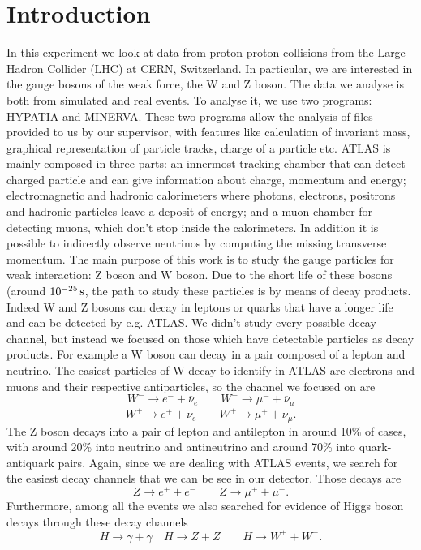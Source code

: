 \documentclass[a4paper,10pt]{article}
\begin{document}
\section{Introduction}
In this experiment we look at data from proton-proton-collisions from the Large Hadron Collider (LHC) at CERN, Switzerland. In particular, we are interested in the gauge bosons of the weak force, the W and Z boson. The data we analyse is both from simulated and real events. To analyse it, we use two programs: HYPATIA and MINERVA. These two programs allow the analysis of files provided to us by our supervisor, with features like calculation of invariant mass, graphical representation of particle tracks, charge of a particle etc.
ATLAS is mainly composed in three parts: an innermost tracking chamber that can detect charged particle and can give information about charge, momentum and energy; electromagnetic and hadronic calorimeters where photons, electrons, positrons and hadronic particles leave a deposit of energy; and a muon chamber for detecting muons, which don't stop inside the calorimeters. In addition it is possible to indirectly observe neutrinos by computing the missing transverse momentum. 
The main purpose of this work is to study the gauge particles for weak interaction: Z boson and W boson. Due to the short life of these bosons (around $\SI{E-25}{\second}$, the path to study these particles is by means of decay products. Indeed W and Z bosons can decay in leptons or quarks that have a longer life and can be detected by e.g. ATLAS. We didn't study every possible decay channel, but instead we focused on those which have detectable particles as decay products. For example a W boson can decay in a pair composed of a lepton and neutrino. The easiest particles of W decay to identify in ATLAS are electrons and muons and their respective antiparticles, so the channel we focused on are
\[W^- \to e^- + \overline{\nu}_e \qquad W^- \to \mu^- + \overline{\nu}_\mu\]
\[W^+ \to e^+ + \nu_e \qquad W^+ \to \mu^+ + \nu_\mu. \]
The Z boson decays into a pair of lepton and antilepton in around 10\% of cases, with around 20\% into neutrino and antineutrino and around 70\% into quark-antiquark pairs. Again, since we are dealing with ATLAS events, we search for the easiest decay channels that we can be see in our detector. Those decays are
\[Z \to e^+ + e^- \qquad Z \to \mu^+ + \mu^-.\]
Furthermore, among all the events we also searched for evidence of Higgs boson decays through these decay channels
\[H \to \gamma + \gamma \quad H \to Z+ Z \qquad H \to W^+ + W^-.\]
\end{document}

